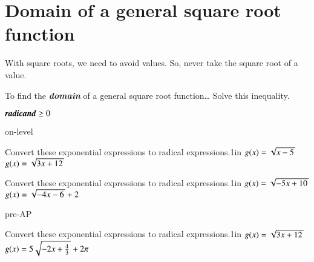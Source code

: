 \section{Domain of a general square root function}

With square roots, we need to avoid  values. 
So, never take the square root of a  value.

\begin{myConcept}{To find the {\bfseries\itshape domain} of a general square root function\dots}
    Solve this inequality.
    \begin{myCenteredBox}[width=2in]
        \centering\LARGE 
        $ \text{\itshape\bfseries radicand} \geq 0 $ 
    \end{myCenteredBox}
\end{myConcept}




\begin{taggedblock}{on-level}
    \begin{myProblems2}{Convert these exponential expressions to radical expressions.}{1in}
        {
            $ g(x) = \myRoot{x - 5}$ 
        }
        {
            $ g(x) = \myRoot{3x + 12}$ 
        }
    \end{myProblems2}
    \begin{myProblems2}{Convert these exponential expressions to radical expressions.}{1in}
        {
            $ g(x) = \myRoot{-5x + 10}$ 
        }
        {
            $ g(x) = \myRoot{-4x - 6} + 2$ 
        }
    \end{myProblems2}
\end{taggedblock}


\begin{taggedblock}{pre-AP}
    \begin{myProblems2}{Convert these exponential expressions to radical expressions.}{1in}
        {
            $ g(x) = \myRoot{3x + 12}$ 
        }
        {
            $ g(x) = 5\myRoot{-2x + \frac{4}{3}} + 2\pi$ 
        }
    \end{myProblems2}
\end{taggedblock}
